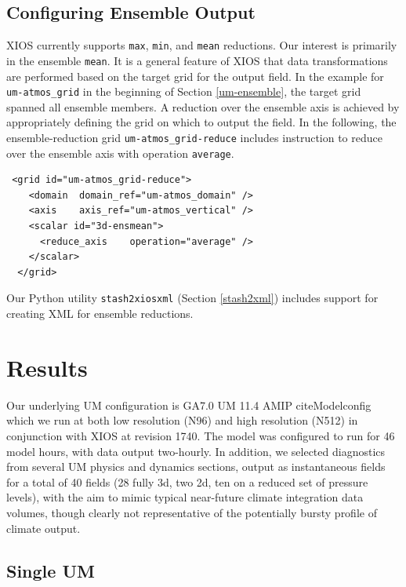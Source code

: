 \documentclass[twocolumn, 12pt]{paper}
\begin{document}
\subsection{Configuring Ensemble Output}

XIOS currently supports \texttt{max}, \texttt{min}, and \texttt{mean} reductions.
Our interest is primarily in the ensemble \texttt{mean}.
It is a general feature of XIOS that data transformations are performed based on the target grid for the output field.
In the example for \texttt{um-atmos\_grid} in the beginning of Section \ref{um-ensemble}, the target grid spanned all ensemble members.
A reduction over the ensemble axis is achieved by appropriately defining the grid on which to output the field.
In the following, the ensemble-reduction grid \texttt{um-atmos\_grid-reduce} includes instruction to reduce over the ensemble axis with operation \texttt{average}.

\begin{verbatim}
 <grid id="um-atmos_grid-reduce">
    <domain  domain_ref="um-atmos_domain" />
    <axis    axis_ref="um-atmos_vertical" />
    <scalar id="3d-ensmean">
      <reduce_axis    operation="average" />
    </scalar>
  </grid>
\end{verbatim}

Our Python utility \texttt{stash2xiosxml} (Section \ref{stash2xml}) includes support for creating XML for ensemble reductions.


\section{Results}
\label{results}

Our underlying UM configuration is GA7.0 UM 11.4 AMIP cite{Modelconfig} which we run at both low resolution (N96) and high resolution (N512) in conjunction with XIOS at revision 1740.
The model was configured to run for 46 model hours, with data output two-hourly.
In addition, we selected diagnostics from several UM physics and dynamics sections, output as instantaneous fields for a total of 40 fields (28 fully 3d, two 2d, ten on a reduced set of pressure levels), with the aim to mimic typical near-future climate integration data volumes, though clearly not representative of the potentially bursty profile of climate output.

\subsection{Single UM}
\end{document}
